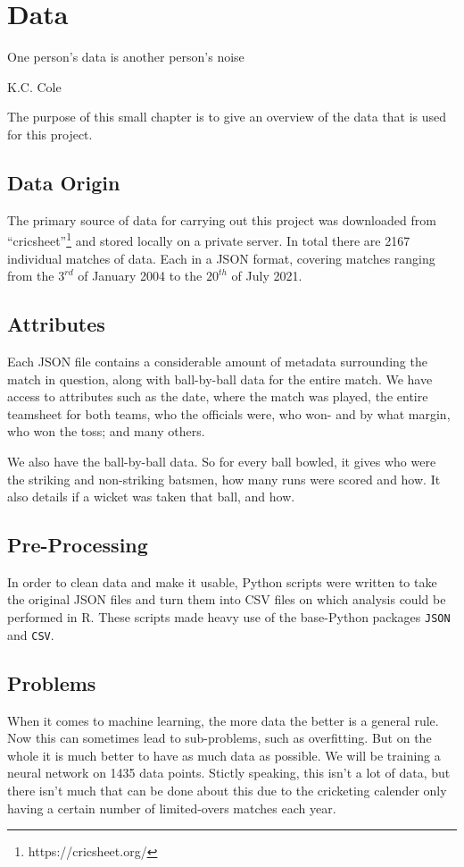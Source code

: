 \chapter{Data}

\epigraph{One person's data is another person's noise}{K.C. Cole}

The purpose of this small chapter is to give an overview of the data that is used for this project.

\section{Data Origin}
The primary source of data for carrying out this project was downloaded from ``cricsheet''\footnote{https://cricsheet.org/}
and stored locally on a private server. In total there are 2167 individual matches of data. Each in a JSON format, 
covering matches ranging from the $3^{rd}$ of January 2004 to the $20^{th}$ of July 2021.

\section{Attributes}
Each JSON file contains a considerable amount of metadata surrounding the match in question, along with 
ball-by-ball data for the entire match. We have access to attributes such as the date, where the match was played,
the entire teamsheet for both teams, who the officials were, who won- and by what margin, who won the toss; and many others.

We also have the ball-by-ball data. So for every ball bowled, it gives who were the striking and non-striking batsmen, how many runs
were scored and how. It also details if a wicket was taken that ball, and how.

\section{Pre-Processing}
In order to clean data and make it usable, Python scripts were written to take the original JSON files and turn them into CSV files on which analysis could 
be performed in R. These scripts made heavy use of the base-Python packages \verb|JSON| and \verb|CSV|.

\section{Problems}
When it comes to machine learning, the more data the better is a general rule. Now this can sometimes lead to sub-problems, such as overfitting. But on the whole 
it is much better to have as much data as possible. We will be training a neural network on 1435 data points. Stictly speaking, this isn't a lot of data, but there
isn't much that can be done about this due to the cricketing calender only having a certain number of limited-overs matches each year.
